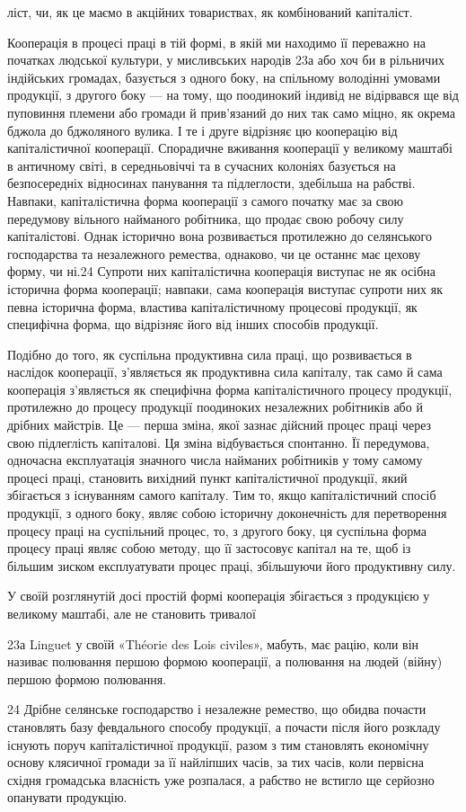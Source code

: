 ліст, чи, як це маємо в акційних товариствах, як комбінований
капіталіст.

Кооперація в процесі праці в тій формі, в якій ми находимо
її переважно на початках людської культури, у мисливських народів
23а або хоч би в рільничих індійських громадах, базується
з одного боку, на спільному володінні умовами продукції, з другого
боку — на тому, що поодинокий індивід не відірвався ще від
пуповиння племени або громади й прив’язаний до них так само
міцно, як окрема бджола до бджоляного вулика. І те і друге відрізняє
цю кооперацію від капіталістичної кооперації. Спорадичне
вживання кооперації у великому маштабі в античному світі, в
середньовіччі та в сучасних колоніях базується на безпосередніх
відносинах панування та підлеглости, здебільша на рабстві.
Навпаки, капіталістична форма кооперації з самого початку має
за свою передумову вільного найманого робітника, що продає
свою робочу силу капіталістові. Однак історично вона розвивається
протилежно до селянського господарства та незалежного
ремества, однаково, чи це останнє має цехову форму, чи ні.24
Супроти них капіталістична кооперація виступає не як осібна
історична форма кооперації; навпаки, сама кооперація виступає
супроти них як певна історична форма, властива капіталістичному
процесові продукції, як специфічна форма, що відрізняє
його від інших способів продукції.

Подібно до того, як суспільна продуктивна сила праці, що
розвивається в наслідок кооперації, з’являється як продуктивна
сила капіталу, так само й сама кооперація з’являється як специфічна
форма капіталістичного процесу продукції, протилежно до
процесу продукції поодиноких незалежних робітників або й дрібних
майстрів. Це — перша зміна, якої зазнає дійсний процес
праці через свою підлеглість капіталові. Ця зміна відбувається
спонтанно. Її передумова, одночасна експлуатація значного
числа найманих робітників у тому самому процесі праці, становить
вихідний пункт капіталістичної продукції, який збігається
з існуванням самого капіталу. Тим то, якщо капіталістичний
спосіб продукції, з одного боку, являє собою історичну доконечність
для перетворення процесу праці на суспільний процес, то,
з другого боку, ця суспільна форма процесу праці являє собою
методу, що її застосовує капітал на те, щоб із більшим зиском
експлуатувати процес праці, збільшуючи його продуктивну силу.

У своїй розглянутій досі простій формі кооперація збігається
з продукцією у великому маштабі, але не становить тривалої

23а Linguet у своїй «Théorie des Lois civiles», мабуть, має рацію, коли
він називає полювання першою формою кооперації, а полювання на людей
(війну) першою формою полювання.

24 Дрібне селянське господарство і незалежне ремество, що обидва
почасти становлять базу февдального способу продукції, а почасти після
його розкладу існують поруч капіталістичної продукції, разом з тим становлять
економічну основу клясичної громади за її найліпших часів, за
тих часів, коли первісна східня громадська власність уже розпалася, а
рабство не встигло ще серйозно опанувати продукцію.
